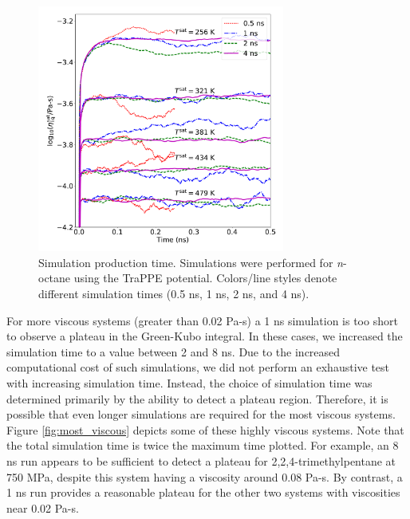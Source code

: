 \documentclass[preprint,review,12pt]{elsarticle}
\begin{document}
	\begin{figure}[htb!]
		\centering
		\includegraphics[width=3.2in]{simulation_time}
		\caption{Simulation production time. Simulations were performed for \textit{n}-octane using the TraPPE potential. Colors/line styles denote different simulation times (0.5 ns, 1 ns, 2 ns, and 4 ns).}
		\label{fig:simulation_time}
	\end{figure} 

    For more viscous systems (greater than 0.02 Pa-s) a 1 ns simulation is too short to observe a plateau in the Green-Kubo integral. In these cases, we increased the simulation time to a value between 2 and 8 ns. Due to the increased computational cost of such simulations, we did not perform an exhaustive test with increasing simulation time. Instead, the choice of simulation time was determined primarily by the ability to detect a plateau region. Therefore, it is possible that even longer simulations are required for the most viscous systems. Figure \ref{fig:most_viscous} depicts some of these highly viscous systems. Note that the total simulation time is twice the maximum time plotted. For example, an 8 ns run appears to be sufficient to detect a plateau for 2,2,4-trimethylpentane at 750 MPa, despite this system having a viscosity around 0.08 Pa-s. By contrast, a 1 ns run provides a reasonable plateau for the other two systems with viscosities near 0.02 Pa-s.
    
\end{document}
